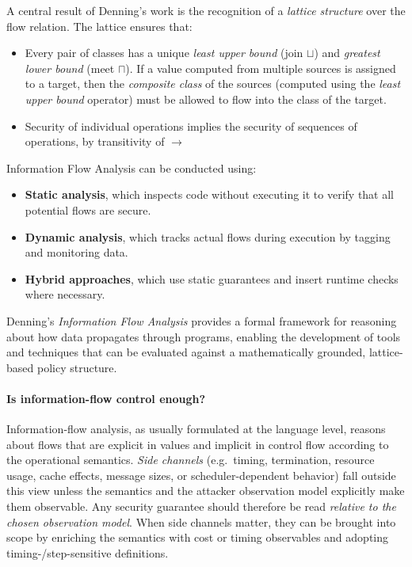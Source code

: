\documentclass[12pt,a4paper,twoside]{book}
\begin{document}
A central result of Denning’s work is the recognition of a \textit{lattice structure} over the flow relation. The lattice ensures that:
\begin{itemize}
  \item Every pair of classes has a unique \textit{least upper bound} (join \( \sqcup \)) and \textit{greatest lower bound} (meet \( \sqcap \)).
If a value computed from multiple sources is assigned to a target, then the \textit{composite class} of the sources (computed using the \textit{least upper bound} operator) must be allowed to flow into the class of the target.
  \item Security of individual operations implies the security of sequences of operations, by transitivity of $\rightarrow$
\end{itemize}

Information Flow Analysis can be conducted using:
\begin{itemize}
  \item \textbf{Static analysis}, which inspects code without executing it to verify that all potential flows are secure.
  \item \textbf{Dynamic analysis}, which tracks actual flows during execution by tagging and monitoring data.
  \item \textbf{Hybrid approaches}, which use static guarantees and insert runtime checks where necessary.
\end{itemize}

Denning's \textit{Information Flow Analysis} provides a formal framework for reasoning about how data propagates through programs, enabling the development of tools and techniques that can be evaluated against a mathematically grounded, lattice-based policy structure.

\paragraph{Is information-flow control enough?}
Information-flow analysis, as usually formulated at the language level, reasons
about flows that are explicit in values and implicit in control flow according to
the operational semantics\cite{sabelfeld2003language}.
\emph{Side channels} (e.g.\ timing, termination,
resource usage, cache effects, message sizes, or scheduler-dependent behavior)
fall outside this view unless the semantics and the attacker observation model
explicitly make them observable.
Any security guarantee should therefore be read
\emph{relative to the chosen observation model}.
When side channels matter, they can be brought into scope by enriching the semantics with cost or timing
observables and adopting timing-/step-sensitive definitions\cite{197207}.
\end{document}
